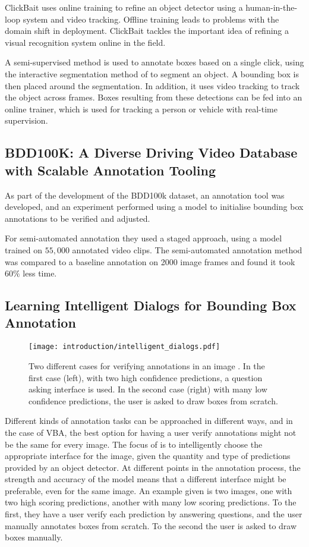 ClickBait uses online training to refine an object detector using a human-in-the-loop system and video tracking. Offline training leads to problems with the domain shift in deployment. ClickBait tackles the important idea of refining a visual recognition system online in the field.

A semi-supervised method is used to annotate boxes based on a single click, using the interactive segmentation method of \cite{Xu2016} to segment an object. A bounding box is then placed around the segmentation. In addition, it uses video tracking to track the object across frames. Boxes resulting from these detections can be fed into an online trainer, which is used for tracking a person or vehicle with real-time supervision.


\subsection{BDD100K: A Diverse Driving Video Database with
Scalable Annotation Tooling \cite{Yu2018a}}

As part of the development of the BDD100k dataset, an annotation tool was developed, and an experiment performed using a model to initialise bounding box annotations to be verified and adjusted. 

For semi-automated annotation they used a staged approach, using a model trained on $55,000$ annotated video clips. The semi-automated annotation method was compared to a baseline annotation on 2000 image frames and found it took $60\%$ less time.

\subsection{Learning Intelligent Dialogs for Bounding Box Annotation}

\begin{figure}[h]
  \centering
  \texttt{[image: introduction/intelligent\_dialogs.pdf]}
  \caption{Two different cases for verifying annotations in an image \cite{Konyushkova2017}. In the first case (left), with two high confidence predictions, a question asking interface is used. In the second case (right) with many low confidence predictions, the user is asked to draw boxes from scratch. }
  \label{fig:intelligent_dialogs}
\end{figure}

Different kinds of annotation tasks can be approached in different ways, and in the case of \gls{VBA}, the best option for having a user verify annotations might not be the same for every image. The focus of \cite{Konyushkova2017} is to intelligently choose the appropriate interface for the image, given the quantity and type of predictions provided by an object detector. At different points in the annotation process, the strength and accuracy of the model means that a different interface might be preferable, even for the same image. An example given is two images, one with two high scoring predictions, another with many low scoring predictions. To the first, they have a user verify each prediction by answering questions, and the user manually annotates boxes from scratch. To the second the user is asked to draw boxes manually. 


